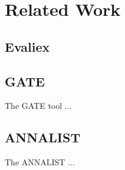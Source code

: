 \section{Related Work}

\subsection{Evaliex}

\subsection{\acs{GATE}}
The \gls{GATE} tool ...

\subsection{\acs{ANNALIST}}
The \gls{ANNALIST} ...
